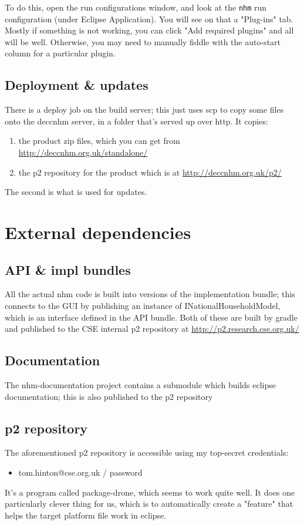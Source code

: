 \documentclass[11pt]{article}
\begin{document}
To do this, open the run configurations window, and look at the \texttt{nhm} run configuration (under Eclipse Application). You will see on that a "Plug-ins" tab. Mostly if something is not working, you can click "Add required plugins" and all will be well. Otherwise, you may need to manually fiddle with the auto-start column for a particular plugin.
\subsection{Deployment \& updates}
\label{sec-2-3}
There is a deploy job on the build server; this just uses scp to copy some files onto the deccnhm server, in a folder that's served up over http. It copies:

\begin{enumerate}
\item the product zip files, which you can get from \url{http://deccnhm.org.uk/standalone/}
\item the p2 repository for the product which is at \url{http://deccnhm.org.uk/p2/}
\end{enumerate}

The second is what is used for updates.
\section{External dependencies}
\label{sec-3}
\subsection{API \& impl bundles}
\label{sec-3-1}
All the actual nhm code is built into versions of the implementation bundle; this connects to the GUI by publishing an instance of INationalHouseholdModel, which is an interface defined in the API bundle. Both of these are built by gradle and published to the CSE internal p2 repository at \url{http://p2.research.cse.org.uk/}
\subsection{Documentation}
\label{sec-3-2}
The nhm-documentation project contains a submodule which builds eclipse documentation; this is also published to the p2 repository
\subsection{p2 repository}
\label{sec-3-3}
The aforementioned p2 repository is accessible using my top-secret credentials:
\begin{itemize}
\item tom.hinton@cse.org.uk / password
\end{itemize}
It's a program called package-drone, which seems to work quite well. It does one particularly clever thing for us, which is to automatically create a "feature" that helps the target platform file work in eclipse.
\end{document}
